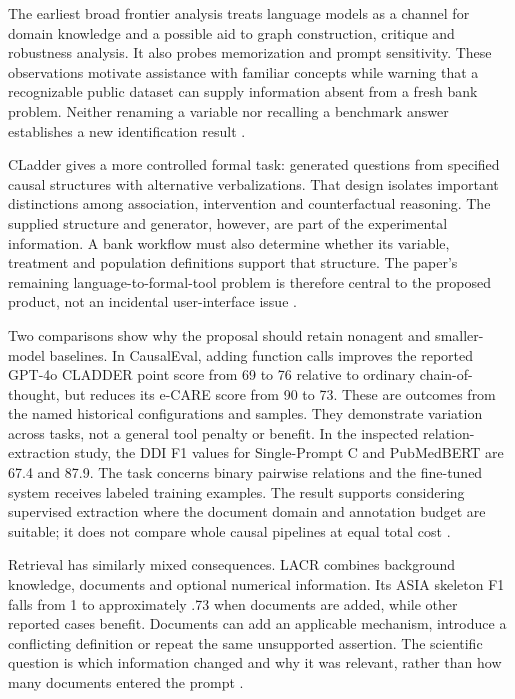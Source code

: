 The earliest broad frontier analysis treats language models as a channel for
domain knowledge and a possible aid to graph construction, critique and
robustness analysis. It also probes memorization and prompt sensitivity. These
observations motivate assistance with familiar concepts while warning that a
recognizable public dataset can supply information absent from a fresh bank
problem. Neither renaming a variable nor recalling a benchmark answer
establishes a new identification result \citep{v12_la_2305_00050}.

CLadder gives a more controlled formal task: generated questions from specified
causal structures with alternative verbalizations. That design isolates
important distinctions among association, intervention and counterfactual
reasoning. The supplied structure and generator, however, are part of the
experimental information. A bank workflow must also determine whether its
variable, treatment and population definitions support that structure. The
paper's remaining language-to-formal-tool problem is therefore central to the
proposed product, not an incidental user-interface issue
\citep{v12_la_2312_04350}.

Two comparisons show why the proposal should retain nonagent and smaller-model
baselines. In CausalEval, adding function calls improves the reported GPT-4o
CLADDER point score from 69 to 76 relative to ordinary chain-of-thought, but
reduces its e-CARE score from 90 to 73. These are outcomes from the named
historical configurations and samples. They demonstrate variation across tasks,
not a general tool penalty or benefit. In the inspected relation-extraction
study, the DDI F1 values for Single-Prompt C and PubMedBERT are 67.4 and 87.9.
The task concerns binary pairwise relations and the fine-tuned system receives
labeled training examples. The result supports considering supervised
extraction where the document domain and annotation budget are suitable; it
does not compare whole causal pipelines at equal total cost
\citep{exec13_census_causaleval,exec13_census_graph_validation}.

Retrieval has similarly mixed consequences. LACR combines background knowledge,
documents and optional numerical information. Its ASIA skeleton F1 falls from 1
to approximately .73 when documents are added, while other reported cases
benefit. Documents can add an applicable mechanism, introduce a conflicting
definition or repeat the same unsupported assertion. The scientific question
is which information changed and why it was relevant, rather than how many
documents entered the prompt \citep{v12_la_2402_15301}.

